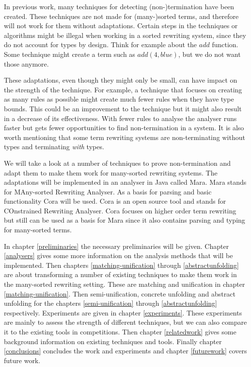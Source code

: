 In previous work, many techniques for detecting (non-)termination have been created. These techniques are not made for (many-)sorted terms, and therefore will not work for them without adaptations. Certain steps in the techniques or algorithms might be illegal when working in a sorted rewriting system, since they do not account for types by design. Think for example about the $add$ function. Some technique might create a term such as $add(4, blue)$, but we do not want those anymore. 

These adaptations, even though they might only be small, can have impact on the strength of the technique. For example, a technique that focuses on creating as many rules as possible might create much fewer rules when they have type bounds. This could be an improvement to the technique but it might also result in a decrease of its effectiveness. With fewer rules to analyse the analyser runs faster but gets fewer opportunities to find non-termination in a system. It is also worth mentioning that some term rewriting systems are non-terminating without types and terminating \textit{with} types.

We will take a look at a number of techniques to prove non-termination and adapt them to make them work for many-sorted rewriting systems. The adaptations will be implemented in an analyser in Java called Mara. Mara stands for MAny-sorted Rewriting Analyser. As a basis for parsing and basic functionality Cora will be used. Cora is an open source tool and stands for COnstrained Rewriting Analyser. Cora focuses on higher order term rewriting but still can be used as a basis for Mara since it also contains parsing and typing for many-sorted terms. 

In chapter \ref{preliminaries} the necessary preliminaries will be given. Chapter \ref{analysers} gives some more information on the analysis methods that will be implemented. Then chapters \ref{matching-unification} through \ref{abstractunfolding} are about transforming a number of existing techniques to make them work in the many-sorted rewriting setting. These are matching and unification in chapter \ref{matching-unification}. Then semi-unification, concrete unfolding and abstract unfolding for the chapters \ref{semi-unification} through \ref{abstractunfolding} respectively. Experiments are given in chapter \ref{experiments}. These experiments are mainly to  assess the strength of different techniques, but we can also compare it to the existing tools in competitions. Then chapter \ref{relatedwork} gives some background information on existing techniques and tools. Finally chapter \ref{conclusions} concludes the work and experiments and chapter \ref{futurework} covers future work. 
